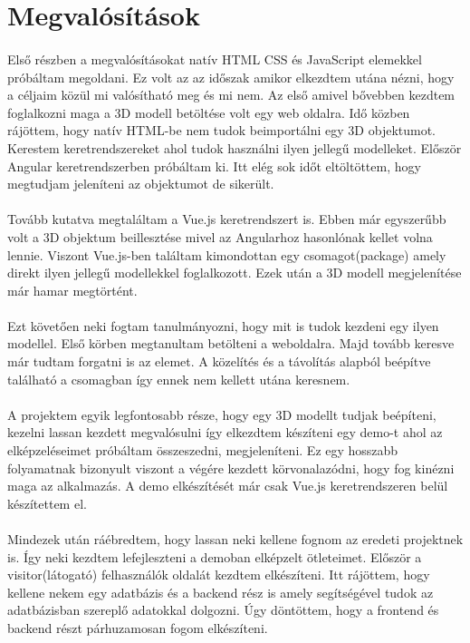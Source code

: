 \section{Megvalósítások}
	\paragraph{}
	Első részben a megvalósításokat natív HTML CSS és JavaScript elemekkel próbáltam megoldani. Ez volt az az időszak amikor elkezdtem utána nézni, hogy a céljaim közül mi valósítható meg és mi nem. Az első amivel bővebben kezdtem foglalkozni maga a 3D modell betöltése volt egy web oldalra. Idő közben rájöttem, hogy natív HTML-be nem tudok beimportálni egy 3D objektumot. Kerestem keretrendszereket ahol tudok használni ilyen jellegű modelleket. Először Angular keretrendszerben próbáltam ki. Itt elég sok időt eltöltöttem, hogy megtudjam jeleníteni az objektumot de sikerült.
	\paragraph{}
	Tovább kutatva megtaláltam a Vue.js keretrendszert is. Ebben már egyszerűbb volt a 3D objektum beillesztése mivel az Angularhoz hasonlónak kellet volna lennie. Viszont Vue.js-ben találtam kimondottan egy csomagot(package) amely direkt ilyen jellegű modellekkel foglalkozott. Ezek után a 3D modell megjelenítése már hamar megtörtént. 
	\paragraph{}
	Ezt követően neki fogtam tanulmányozni, hogy mit is tudok kezdeni egy ilyen modellel. Első körben megtanultam betölteni a weboldalra. Majd tovább keresve már tudtam forgatni is az elemet. A közelítés és a távolítás alapból beépítve található a csomagban így ennek nem kellett utána keresnem.
	\paragraph{}
	A projektem egyik legfontosabb része, hogy egy 3D modellt tudjak beépíteni, kezelni lassan kezdett megvalósulni így elkezdtem készíteni egy demo-t ahol az elképzeléseimet próbáltam összeszedni, megjeleníteni. Ez egy hosszabb folyamatnak bizonyult viszont a végére kezdett körvonalazódni, hogy fog kinézni maga az alkalmazás. A demo elkészítését már csak Vue.js keretrendszeren belül készítettem el.
	\paragraph{}
	Mindezek után ráébredtem, hogy lassan neki kellene fognom az eredeti projektnek is. Így neki kezdtem lefejleszteni a demoban elképzelt ötleteimet. Először a visitor(látogató) felhasználók oldalát kezdtem elkészíteni. Itt rájöttem, hogy kellene nekem egy adatbázis és a backend rész is amely segítségével tudok az adatbázisban szereplő adatokkal dolgozni. Úgy döntöttem, hogy a frontend és backend részt párhuzamosan fogom elkészíteni.
